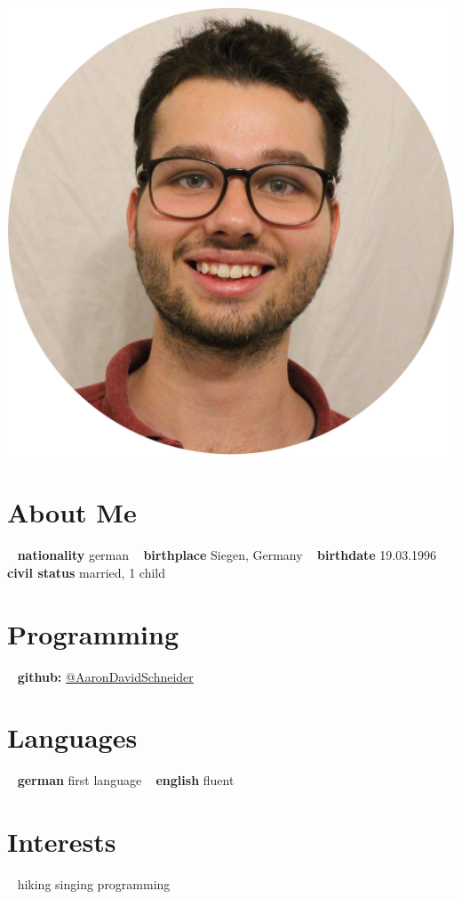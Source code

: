 \documentclass[]{friggeri-cv}
\begin{document}



\begin{aside}
  \includegraphics[scale=0.04]{img/Aaron_Circle}
\section{About Me}
~  
\textbf{nationality}
  german
   ~
  \textbf{birthplace}
  Siegen, Germany
  ~
  \textbf{birthdate}
  19.03.1996
  ~  
  \textbf{civil status}
  married, 1 child
  \section{Programming}
  ~
    \textbf{github:} 
    \href{https://github.com/AaronDavidSchneider/}{@AaronDavidSchneider}
     \section{Languages}
	  ~
    \textbf{german}
    first language
    ~
    \textbf{english}
    fluent
 \section{Interests}
~
 hiking
 singing
   programming
\end{aside}
\end{document}
